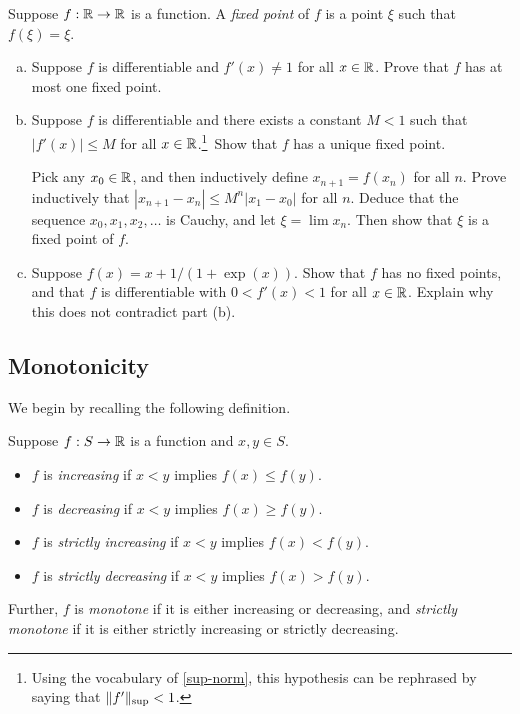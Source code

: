 \begin{exercise} \label{fixed-points}
	Suppose $f : \mathbb{R} \to \mathbb{R}$ is a function. A \emph{fixed point} of $f$ is a point $\xi$ such that $f(\xi) = \xi$. 
	\begin{enumerate}[(a)]
		\item Suppose $f$ is differentiable and $f'(x) \neq 1$ for all $x \in \mathbb{R}$. Prove that $f$ has at most one fixed point. 
		\item Suppose $f$ is differentiable and there exists a constant $M < 1$ such that $|f'(x)| \leq M$ for all $x \in \mathbb{R}$.\footnote{Using the vocabulary of \cref{sup-norm}, this hypothesis can be rephrased by saying that $\|f'\|_{\mathrm{sup}} < 1$.}\ Show that $f$ has a unique fixed point.  
		
		\begin{hint}
			Pick any $x_0 \in \mathbb{R}$, and then inductively define $x_{n+1} = f(x_n)$ for all $n$. Prove inductively that $|x_{n+1} - x_n| \leq M^n|x_1 - x_0|$ for all $n$. Deduce that the sequence $x_0, x_1, x_2, \dotsc$ is Cauchy, and let $\xi = \lim x_n$. Then show that $\xi$ is a fixed point of $f$. 
		\end{hint}
	
		\item Suppose $f(x) = x + 1/(1 + \exp(x))$.
		Show that $f$ has no fixed points, and that $f$ is differentiable with $0 < f'(x) < 1$ for all $x \in \mathbb{R}$. Explain why this does not contradict part (b). 
	\end{enumerate}
\end{exercise}

\subsection{Monotonicity}

We begin by recalling the following definition. 

\begin{definition}       
	Suppose $f : S \to \mathbb{R}$ is a function and $x, y \in S$. 
	\begin{itemize}
		\item $f$ is \emph{increasing} if $x < y$ implies $f(x) \leq f(y)$. 
		\item $f$ is \emph{decreasing} if $x < y$ implies $f(x) \geq f(y)$.
		\item $f$ is \emph{strictly increasing} if $x < y$ implies $f(x) < f(y)$. 
		\item $f$ is \emph{strictly decreasing} if $x < y$ implies $f(x) > f(y)$. 
	\end{itemize}
Further, $f$ is \emph{monotone} if it is either increasing or decreasing, and \emph{strictly monotone} if it is either strictly increasing or strictly decreasing. 
\end{definition}

